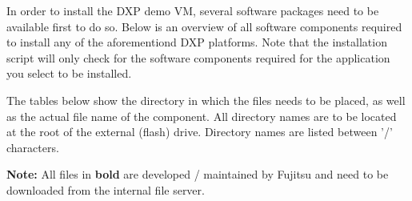 \begin{myindent}
In order to install the DXP demo VM, several software packages need to be available first to do so. Below is an overview of all software components required
to install any of the aforementiond DXP platforms. Note that the installation script will only check for the software components required for the application
you select to be installed.
\newline

\noindent The tables below show the directory in which the files needs to be placed, as well as the actual file name of the component. All directory names are to be
located at the root of the external (flash) drive. Directory names are listed between '/' characters.
\newline

\noindent \textbf{Note:} All files in \textbf{bold} are developed / maintained by Fujitsu
and need to be downloaded from the internal file server.
\newline
\end{myindent}

